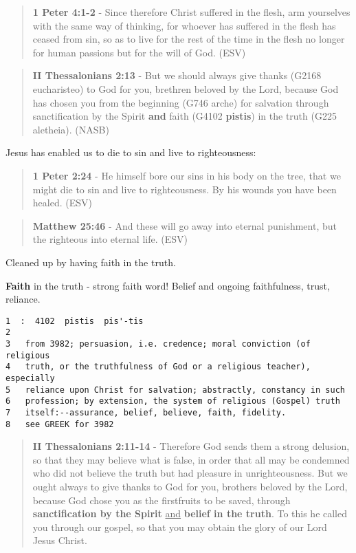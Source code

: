 \documentclass[11pt]{article}
\begin{document}
\begin{quote}
\textbf{1 Peter 4:1-2} - Since therefore Christ suffered in the flesh, arm yourselves with the same way of thinking, for whoever has suffered in the flesh has ceased from sin, so as to live for the rest of the time in the flesh no longer for human passions but for the will of God. (ESV)
\end{quote}

\begin{quote}
\textbf{II Thessalonians 2:13} - But we should always give thanks (G2168 eucharisteo) to God for you, brethren beloved by the Lord, because God has chosen you from the beginning (G746 arche) for salvation through sanctification by the Spirit \textbf{and} faith (G4102 \textbf{pistis}) in the truth (G225 aletheia). (NASB)
\end{quote}

Jesus has enabled us to die to sin and live to righteousness:

\begin{quote}
\textbf{1 Peter 2:24} - He himself bore our sins in his body on the tree, that we might die to sin and live to righteousness.  By his wounds you have been healed.  (ESV)
\end{quote}

\begin{quote}
\textbf{Matthew 25:46} - And these will go away into eternal punishment, but the righteous into eternal life. (ESV)
\end{quote}

Cleaned up by having faith in the truth.

\textbf{Faith} in the truth - strong faith word! Belief and ongoing faithfulness, trust, reliance.

\begin{verbatim}
1  :  4102  pistis  pis'-tis
2  
3   from 3982; persuasion, i.e. credence; moral conviction (of religious
4   truth, or the truthfulness of God or a religious teacher), especially
5   reliance upon Christ for salvation; abstractly, constancy in such
6   profession; by extension, the system of religious (Gospel) truth
7   itself:--assurance, belief, believe, faith, fidelity.
8   see GREEK for 3982
\end{verbatim}

\begin{quote}
\textbf{II Thessalonians 2:11-14} - Therefore God sends them a strong delusion, so that they may believe what is false, in order that all may be condemned who did not believe the truth but had pleasure in unrighteousness. But we ought always to give thanks to God for you, brothers beloved by the Lord, because God chose you as the firstfruits to be saved, through \textbf{sanctification by the Spirit} \uline{and} \textbf{belief in the truth}. To this he called you through our gospel, so that you may obtain the glory of our Lord Jesus Christ.
\end{quote}
\end{document}
